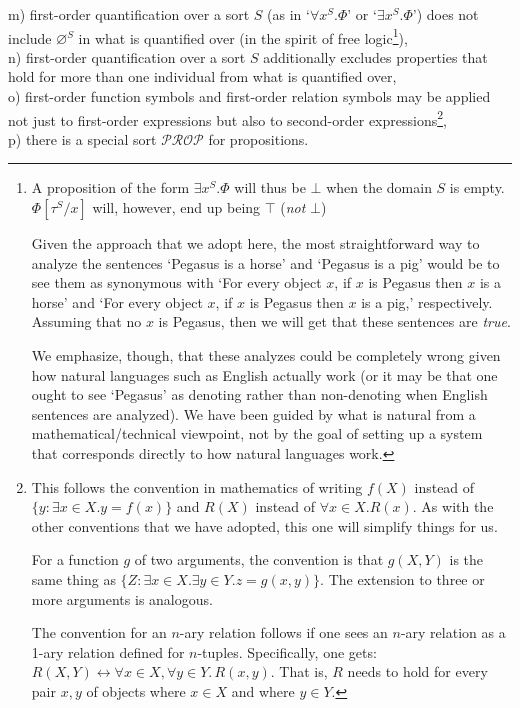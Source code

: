 \documentclass[12pt]{book}
\begin{document}
m) first-order quantification over a sort $S$ (as in `$\forall x^S.\Phi$' or `$\exists x^S.\Phi$') does not include $\varnothing^S$ in what is quantified over (in the spirit of free logic\footnote{A proposition of the form $\exists x^S.\Phi$ will thus be $\bot$ when the domain $S$ is empty. $\Phi [\tau^S/x]$ will, however, end up being $\top$ (\textit{not} $\bot$)

Given the approach that we adopt here, the most straightforward way to analyze the sentences `Pegasus is a horse' and `Pegasus is a pig' would be to see them as synonymous with `For every object $x$, if $x$ is Pegasus then $x$ is a horse' and `For every object $x$, if $x$ is Pegasus then $x$ is a pig,' respectively. Assuming that no $x$ is Pegasus, then we will get that these sentences are \textit{true}.

We emphasize, though, that these analyzes could be completely wrong given how natural languages such as English actually work (or it may be that one ought to see `Pegasus' as denoting rather than non-denoting when English sentences are analyzed). We have been guided by what is natural from a mathematical/technical viewpoint, not by the goal of setting up a system that corresponds directly to how natural languages work.}),\\
n) first-order quantification over a sort $S$ additionally excludes properties that hold for more than one individual from what is quantified over,\\
o) first-order function symbols and first-order relation symbols may be applied not just to first-order expressions but also to second-order expressions\footnote{This follows the convention in mathematics of writing $f(X)$ instead of $\{y: \exists x \in X. y = f(x)\}$ and $R(X)$ instead of $\forall x \in X.R(x)$. As with the other conventions that we have adopted, this one will simplify things for us.

For a function $g$ of two arguments, the convention is that $g(X, Y)$ is the same thing as $\{Z: \exists x \in X. \exists y \in Y. z = g(x, y)\}$. The extension to three or more arguments is analogous.

The convention for an $n$-ary relation follows if one sees an $n$-ary relation as a 1-ary relation defined for $n$-tuples. Specifically, one gets: $R(X, Y) \leftrightarrow \forall x \in X, \forall y \in Y.\, R(x, y)$. That is, $R$ needs to hold for every pair $x, y$ of objects where $x \in X$ and where $y \in Y$.},\\
p) there is a special sort $\mathcal{PROP}$ for propositions.
\end{document}
